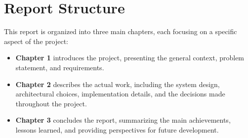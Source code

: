 




\section{Report Structure}

This report is organized into three main chapters, each focusing on a specific aspect of the project:
\begin{itemize}
    \item \textbf{Chapter 1} introduces the project, presenting the general context, problem statement, and requirements.
    
    \item \textbf{Chapter 2} describes the actual work, including the system design, architectural choices, implementation details, and the decisions made throughout the project.
    
    \item \textbf{Chapter 3} concludes the report, summarizing the main achievements, lessons learned, and providing perspectives for future development.
\end{itemize}
